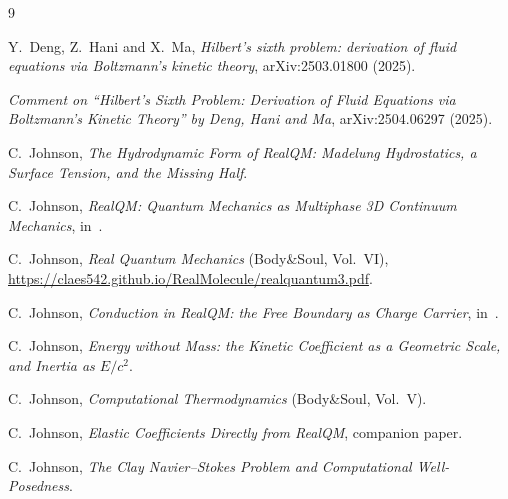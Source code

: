 \documentclass[11pt]{article}
\begin{document}
\begin{thebibliography}{9}

 Y.~Deng, Z.~Hani and X.~Ma, \emph{Hilbert's sixth problem: derivation of fluid
equations via Boltzmann's kinetic theory}, arXiv:2503.01800 (2025).

 \emph{Comment on ``Hilbert's Sixth Problem: Derivation of Fluid Equations via
Boltzmann's Kinetic Theory'' by Deng, Hani and Ma}, arXiv:2504.06297 (2025).

 C.~Johnson, \emph{The Hydrodynamic Form of RealQM: Madelung Hydrostatics, a
Surface Tension, and the Missing Half}.

 C.~Johnson, \emph{RealQM: Quantum Mechanics as Multiphase 3D Continuum Mechanics},
in~\cite{realqmbook}.

 C.~Johnson, \emph{Real Quantum Mechanics} (Body\&Soul, Vol.~VI),
\url{https://claes542.github.io/RealMolecule/realquantum3.pdf}.

 C.~Johnson, \emph{Conduction in RealQM: the Free Boundary as Charge Carrier},
in~\cite{realqmbook}.

 C.~Johnson, \emph{Energy without Mass: the Kinetic Coefficient as a Geometric
Scale, and Inertia as $E/c^2$}.

 C.~Johnson, \emph{Computational Thermodynamics} (Body\&Soul, Vol.~V).

 C.~Johnson, \emph{Elastic Coefficients Directly from RealQM},
companion paper.

 C.~Johnson, \emph{The Clay Navier--Stokes Problem and Computational
Well-Posedness}.

\end{thebibliography}
\end{document}
